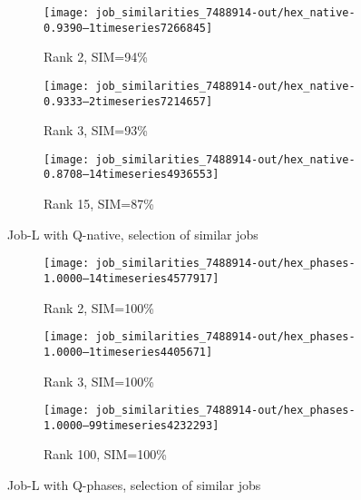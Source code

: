 \documentclass{jhps}
\begin{document}
\begin{figure}[bt]
\begin{subfigure}{0.47\textwidth}
\centering
\texttt{[image: job\_similarities\_7488914-out/hex\_native-0.9390--1timeseries7266845]}
\caption{Rank 2, SIM=94\%}
\end{subfigure}
\begin{subfigure}{0.47\textwidth}
\centering
\texttt{[image: job\_similarities\_7488914-out/hex\_native-0.9333--2timeseries7214657]}
\caption{Rank 3, SIM=93\%}
\end{subfigure}
\begin{subfigure}{0.47\textwidth}
\texttt{[image: job\_similarities\_7488914-out/hex\_native-0.8708--14timeseries4936553]}
\caption{Rank 15, SIM=87\%}
\end{subfigure}

\caption{Job-L with Q-native, selection of similar jobs}%
\label{fig:job-L-hex-native}
\end{figure}

\begin{figure}[bt]
\begin{subfigure}{0.47\textwidth}
\centering
\texttt{[image: job\_similarities\_7488914-out/hex\_phases-1.0000--14timeseries4577917]}
\caption{Rank 2, SIM=100\%}
\end{subfigure}
\begin{subfigure}{0.47\textwidth}
\centering
\texttt{[image: job\_similarities\_7488914-out/hex\_phases-1.0000--1timeseries4405671]}
\caption{Rank 3, SIM=100\%}
\end{subfigure}
\begin{subfigure}{0.47\textwidth}
\centering
\texttt{[image: job\_similarities\_7488914-out/hex\_phases-1.0000--99timeseries4232293]}
\caption{Rank 100, SIM=100\%}
\end{subfigure}

\caption{Job-L with Q-phases, selection of similar jobs}%
\label{fig:job-L-hex-phases}
\end{figure}
\end{document}
